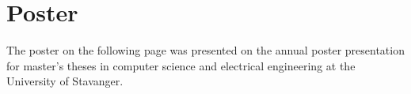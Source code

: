 \section{Poster}
\thispagestyle{plain}
The poster on the following page was presented on the annual poster presentation for master's theses in computer science and electrical engineering at the University of Stavanger.

